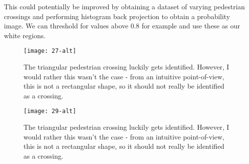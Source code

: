 \documentclass{article}  %
\begin{document}
	This could potentially be improved by obtaining a dataset of varying pedestrian crossings and performing histogram back projection to obtain a probability image. We can threshold for values above 0.8 for example and use these as our white regions.
	
	\begin{figure}[H]
		\begin{minipage}[c]{0.45\linewidth}
			\centering
			\texttt{[image: 27-alt]}
			\caption{The triangular pedestrian crossing luckily gets identified. However, I would rather this wasn't the case - from an intuitive point-of-view, this is not a rectangular shape, so it should not really be identified as a crossing.}
			\label{shape-analysis-img}
		\end{minipage}\hfill
		\begin{minipage}[c]{0.45\linewidth}
			\centering
			\texttt{[image: 29-alt]}
			\caption{The triangular pedestrian crossing luckily gets identified. However, I would rather this wasn't the case - from an intuitive point-of-view, this is not a rectangular shape, so it should not really be identified as a crossing.}
			\label{bus-lane}
		\end{minipage}
	\end{figure}
	
\end{document}
